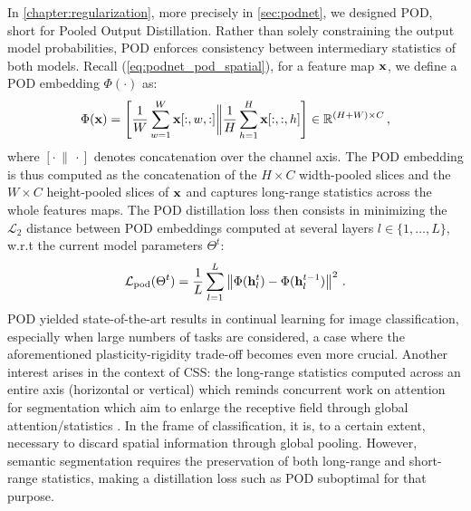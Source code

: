 In \autoref{chapter:regularization}, more precisely in \autoref{sec:podnet}, we designed POD, short
for Pooled Output Distillation. Rather than solely constraining the output model probabilities, POD
enforces consistency between intermediary statistics of both models. Recall
(\autoref{eq:podnet_pod_spatial}), for a feature map $\mathbf{x}$, we define a POD embedding $\Phi(\cdot)$
as:
%
\begin{equation}
    \Phi(\mathbf{x}) = \left[\frac{1}{W} \sum_{w=1}^W \mathbf{x}[:,w,:] \bigg\Vert \frac{1}{H} \sum_{h=1}^H \mathbf{x}[:,:,h]\right] \in \mathbb{R}^{(H + W) \times C}\,,
    \label{eq:seg_pod_embedding}
\end{equation}
%
where $[\cdot\,\|\,\cdot]$ denotes concatenation over the channel axis. The POD embedding is thus
computed as the concatenation of the $H \times C$ width-pooled slices and the $W \times C$
height-pooled slices of $\mathbf{x}$ and captures long-range statistics across the whole features maps. The
POD distillation loss then consists in minimizing the $\mathcal{L}_2$ distance between POD
embeddings computed at several layers $l \in \{1, \dots, L\}$, w.r.t the current model parameters
$\Theta^t$:
%
\begin{equation}
    \mathcal{L}_\text{pod}(\Theta^t) = \frac{1}{L} \sum_{l = 1}^L \left\Vert  \Phi(\mathbf{h}^t_l) -  \Phi(\mathbf{h}^{t-1}_l) \right\Vert^2\,.
    \label{eq:seg_pod_loss}
\end{equation}
%
POD yielded state-of-the-art results in continual learning for image classification, especially when
large numbers of tasks are considered, a case where the aforementioned plasticity-rigidity trade-off
becomes even more crucial. Another interest arises in the context of \ac{CSS}: the long-range statistics
computed across an entire axis (horizontal or vertical) which reminds concurrent work on attention for
segmentation \citep{wang2020axialdeeplab,huang2020ccnet,park2020csc} which aim to enlarge the
receptive field through global attention/statistics \citep{wang2020axialdeeplab}. In the frame of
classification, it is, to a certain extent, necessary to discard spatial information through global
pooling. However, semantic segmentation requires the preservation of both long-range and
short-range statistics, making a distillation loss such as POD suboptimal for that purpose.


